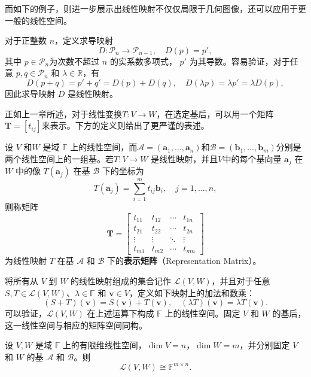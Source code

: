 而如下的例子，则进一步展示出线性映射不仅仅局限于几何图像，还可以应用于更一般的线性空间。
\begin{example}
    \label{ex_derivative_linear_map}
    对于正整数 \(n\)，定义求导映射
    \[
        D:\mathcal P_n\to\mathcal P_{n-1}, \quad D(p)=p',
    \]
    其中 \(p\in\mathcal P_n\)为次数不超过 \(n\) 的实系数多项式， \(p'\) 为其导数。容易验证，对于任意 \(p,q\in\mathcal P_n\) 和 \(\lambda\in\mathbb R\)，有
    \[
        D(p+q)=p'+q'=D(p)+D(q),
        \quad
        D(\lambda p)=\lambda p'=\lambda D(p),
    \]
    因此求导映射 \(D\) 是线性映射。
\end{example}

正如上一章所述，对于线性变换\( T: V \to W  \)，在选定基后，可以用一个矩阵\( \mathbf{T} = [t_{ij}] \)来表示。下方的定义则给出了更严谨的表述。

\begin{definition}[线性映射的表示矩阵]
    \label{def_representation_matrix}
    设 \(V\) 和\(W\) 是域 \(\mathbb F\) 上的线性空间，而\( \mathcal A=(\bm a_1,\ldots,\bm a_n) \)和\( \mathcal B=(\bm b_1,\ldots,\bm b_m) \)分别是两个线性空间上的一组基。若\(T:V\to W\) 是线性映射，并且\( V \)中的每个基向量 \(\bm a_j\) 在 \(W\) 中的像 \(T(\bm a_j)\) 在基 \(\mathcal B\) 下的坐标为
    \[
        T(\bm a_j) = \sum_{i=1}^{m} t_{ij}\bm b_i, \quad j=1,\ldots,n,
    \]
    则称矩阵
    \[
        \mathbf{T}=
        \begin{bmatrix}
            t_{11} & t_{12} & \cdots & t_{1n} \\
            t_{21} & t_{22} & \cdots & t_{2n} \\
            \vdots & \vdots & \ddots & \vdots \\
            t_{m1} & t_{m2} & \cdots & t_{mn}
        \end{bmatrix}
    \]
    为线性映射 \(T\) 在基 \(\mathcal A\) 和 \(\mathcal B\) 下的\textbf{表示矩阵}（Representation Matrix）。
\end{definition}

将所有从 \(V\) 到 \(W\) 的线性映射组成的集合记作 \(\mathcal L(V,W)\)，并且对于任意 \(S,T\in\mathcal L(V,W)\)、\(\lambda\in\mathbb F\) 和 \(\bm v\in V\)，定义如下映射上的加法和数乘：
\[
    (S+T)(\bm v)=S(\bm v)+T(\bm v),
    \quad
    (\lambda T)(\bm v)=\lambda T(\bm v).
\]
可以验证，\(\mathcal L(V,W)\) 在上述运算下构成 \(\mathbb F\) 上的线性空间。固定 \(V\) 和 \(W\) 的基后，这一线性空间与相应的矩阵空间同构。

\begin{theorem}[线性映射空间与矩阵空间的同构]
    \label{thm_linear_map_matrix_space_isomorphism}
    设 \(V,W\) 是域 \(\mathbb F\) 上的有限维线性空间，\(\dim V=n\)，\(\dim W=m\)，并分别固定 \(V\) 和 \(W\) 的基 \(\mathcal A\) 和 \(\mathcal B\)。则
    \[
        \mathcal L(V,W)\cong\mathbb F^{m\times n}.
    \]
\end{theorem}

